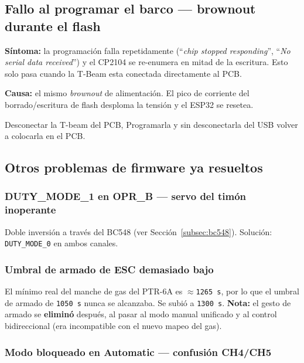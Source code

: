 \documentclass[12pt,a4paper]{article}
\newcommand{\us}[1]{\texttt{#1\,\textmu s}}
\begin{document}
\subsection{Fallo al programar el barco --- brownout durante el flash}

\begin{warningbox}
  \textbf{S\'intoma:} la programaci\'on falla repetidamente (``\emph{chip stopped
  responding}'', ``\emph{No serial data received}'') y el CP2104 se re-enumera en
  mitad de la escritura. Esto solo pasa cuando la T-Beam esta conectada directamente al PCB.

  \textbf{Causa:} el mismo \emph{brownout} de alimentaci\'on. El pico de corriente
  del borrado/escritura de flash desploma la tensi\'on y el ESP32 se resetea.
\end{warningbox}

\begin{okbox}Desconectar la T-beam del PCB, Programarla y sin desconectarla del USB volver a colocarla en el PCB.
\end{okbox}

\subsection{Otros problemas de firmware ya resueltos}

\subsubsection{DUTY\_MODE\_1 en OPR\_B --- servo del tim\'on inoperante}

Doble inversi\'on a trav\'es del BC548 (ver Secci\'on~\ref{subsec:bc548}). Soluci\'on:
\texttt{DUTY\_MODE\_0} en ambos canales.

\subsubsection{Umbral de armado de ESC demasiado bajo}

El m\'inimo real del manche de gas del PTR-6A es $\approx$\us{1265}, por lo que el
umbral de armado de \us{1050} nunca se alcanzaba. Se subi\'o a \us{1300}.
\textbf{Nota:} el gesto de armado se \textbf{elimin\'o} despu\'es, al pasar al modo
manual unificado y al control bidireccional (era incompatible con el nuevo mapeo
del gas).

\subsubsection{Modo bloqueado en Automatic --- confusi\'on CH4/CH5}
\end{document}
